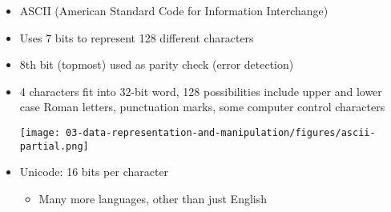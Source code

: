 \begin{frame}[fragile]
\begin{itemize}
\item ASCII (American Standard Code for Information Interchange)
\item Uses 7 bits to represent 128 different characters
\item 8th bit (topmost) used as parity check (error detection)
\item 4 characters fit into 32-bit word, 128 possibilities include upper and lower case Roman letters, punctuation marks, some computer control characters

    \texttt{[image: 03-data-representation-and-manipulation/figures/ascii-partial.png]}
\item Unicode: 16 bits per character 
\begin{itemize}
    \item Many more languages, other than just English
\end{itemize}
	
\end{itemize}
\BNotes\ifnum{}
~%
\fi\ENotes
\end{frame}

